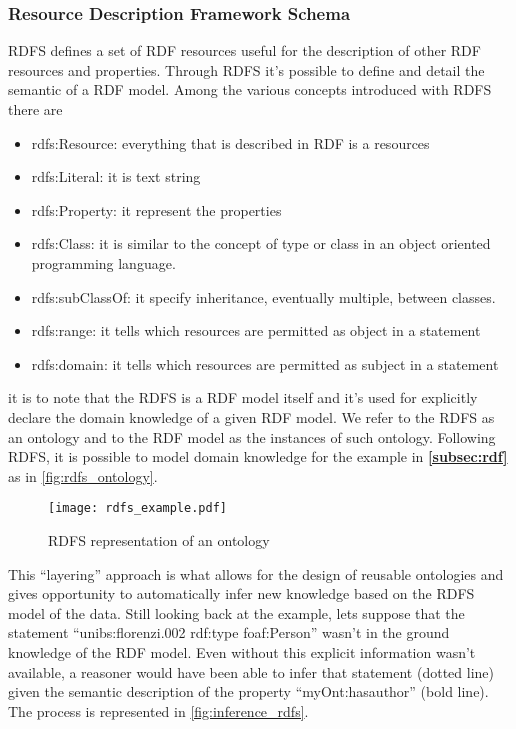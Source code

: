 \subsubsection{Resource Description Framework Schema}
RDFS defines a set of RDF resources useful for the description of other RDF resources and properties. Through RDFS it's possible to define and detail the semantic of a RDF model. Among the various concepts introduced with RDFS there are
\begin{itemize}
  \item rdfs:Resource: everything that is described in RDF is a resources
  \item rdfs:Literal: it is text string
  \item rdfs:Property: it represent the properties
  \item rdfs:Class: it is similar to the concept of type or class in an object oriented programming language.
  \item rdfs:subClassOf: it specify inheritance, eventually multiple, between classes.
  \item rdfs:range: it tells which resources are permitted as object in a statement
  \item rdfs:domain: it tells which resources are permitted as subject in a statement
\end{itemize}

it is to note that the RDFS is a RDF model itself and it's used for explicitly declare the domain knowledge of a given RDF model. We refer to the RDFS as an ontology and to the RDF model as the instances of such ontology.
Following RDFS, it is possible to model domain knowledge for the example in \textbf{\autoref{subsec:rdf}} as in \autoref{fig:rdfs_ontology}.

\begin{figure}
  \centering
  \texttt{[image: rdfs\_example.pdf]}
  \caption{RDFS representation of an ontology}
  \label{fig:rdfs_ontology}
\end{figure}

This ``layering'' approach is what allows for the design of reusable ontologies and gives opportunity to automatically infer new knowledge based on the RDFS model of the data.
Still looking back at the example, lets suppose that the statement ``unibs:florenzi.002 rdf:type foaf:Person'' wasn't in the ground knowledge of the RDF model. Even without this explicit information wasn't available, a reasoner would have been able to infer that statement (dotted line) given the semantic description of the property ``myOnt:has\textunderscore author'' (bold line). The process is represented in \autoref{fig:inference_rdfs}.


